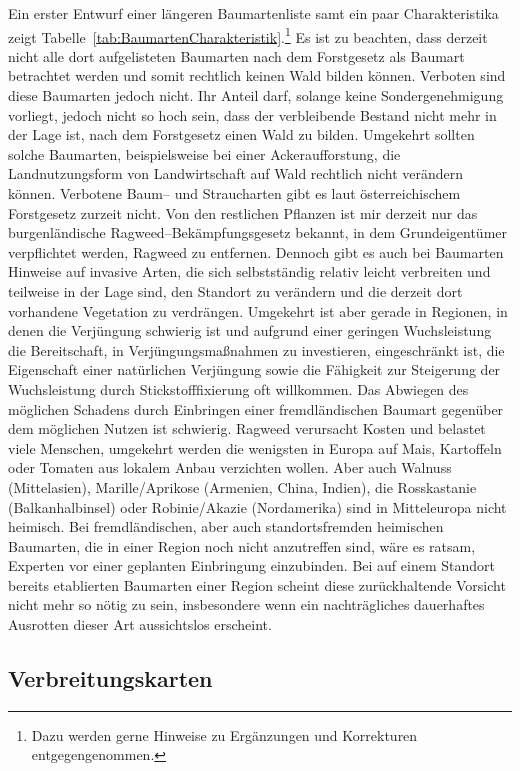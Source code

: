 \documentclass[twocolumn]{scrartcl}
\begin{document}
Ein erster Entwurf einer längeren Baumartenliste samt ein paar Charakteristika
zeigt Tabelle~\ref{tab:BaumartenCharakteristik}.\footnote{Dazu werden gerne
Hinweise zu Ergänzungen und Korrekturen entgegengenommen.} Es ist zu beachten,
dass derzeit nicht alle dort aufgelisteten Baumarten nach dem Forstgesetz als
Baumart betrachtet werden und somit rechtlich keinen Wald bilden können.
Verboten sind diese Baumarten jedoch nicht. Ihr Anteil darf, solange keine
Sondergenehmigung vorliegt, jedoch nicht so hoch sein, dass der verbleibende
Bestand nicht mehr in der Lage ist, nach dem Forstgesetz einen Wald zu bilden.
Umgekehrt sollten solche Baumarten, beispielsweise bei einer Ackeraufforstung,
die Landnutzungsform von Landwirtschaft auf Wald rechtlich nicht verändern
können. Verbotene Baum-- und Straucharten gibt es laut österreichischem
Forstgesetz zurzeit nicht. Von den restlichen Pflanzen ist mir derzeit nur das
burgenländische Ragweed--Bekämpfungsgesetz bekannt, in dem Grundeigentümer
verpflichtet werden, Ragweed zu entfernen. Dennoch gibt es auch bei Baumarten
Hinweise auf invasive Arten, die sich selbstständig relativ leicht verbreiten und
teilweise in der Lage sind, den Standort zu verändern und die derzeit dort
vorhandene Vegetation zu verdrängen. Umgekehrt ist aber gerade in Regionen, in
denen die Verjüngung schwierig ist und aufgrund einer geringen Wuchsleistung
die Bereitschaft, in Verjüngungsmaßnahmen zu investieren, eingeschränkt ist, die
Eigenschaft einer natürlichen Verjüngung sowie die Fähigkeit zur Steigerung der
Wuchsleistung durch Stickstofffixierung oft willkommen. Das Abwiegen des
möglichen Schadens durch Einbringen einer fremdländischen Baumart gegenüber
dem möglichen Nutzen ist schwierig. Ragweed verursacht Kosten und belastet viele
Menschen, umgekehrt werden die wenigsten in Europa auf Mais, Kartoffeln oder
Tomaten aus lokalem Anbau verzichten wollen. Aber auch Walnuss (Mittelasien),
Marille/Aprikose (Armenien, China, Indien), die Rosskastanie (Balkanhalbinsel)
oder Robinie/Akazie (Nordamerika) sind in Mitteleuropa nicht heimisch. Bei
fremdländischen, aber auch standortsfremden heimischen Baumarten, die in einer
Region noch nicht anzutreffen sind, wäre es ratsam, Experten vor einer geplanten
Einbringung einzubinden. Bei auf einem Standort bereits etablierten Baumarten
einer Region scheint diese zurückhaltende Vorsicht nicht mehr so nötig zu sein,
insbesondere wenn ein nachträgliches dauerhaftes Ausrotten dieser Art
aussichtslos erscheint.

\subsection{Verbreitungskarten}
\label{sec:verbreitungskarten}
\end{document}
